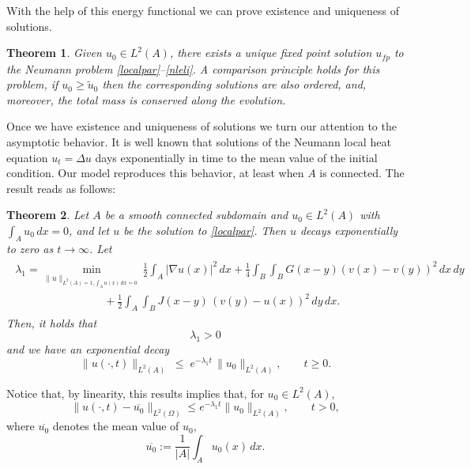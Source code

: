 \documentclass[reqno]{amsart}
\numberwithin{equation}{section}
\newtheorem{theorem}{Theorem}[section]
\begin{document}
With the help of this energy functional we can prove existence and uniqueness of solutions. 

\begin{theorem} \label{teo.existencia.uni.intro}
Given $u_0\in L^2(A)$, there exists a unique fixed point solution $u_{fp}$ to the Neumann problem \eqref{localpar}--\eqref{nleli}. A comparison principle holds for this problem, if $u_0\ge \widetilde{u}_0$ then the corresponding solutions are also ordered,
and, moreover, the total mass is conserved along the evolution.
\end{theorem}

Once we have existence and uniqueness of solutions we turn our attention to 
the asymptotic behavior. 
It is well known that solutions of the Neumann local heat equation 
$u_t = \Delta u $
days exponentially in time to the mean value of the initial condition. 
Our model reproduces this behavior, at least when $A$ is connected. 
The result reads as follows:

\begin{theorem}\label{thm:expdecay.intro} Let $A$ be a smooth connected subdomain and
 $u_0\in L^2(A)$ with $\int_A u_0\,dx = 0$, and let $u$ be the 
solution to \eqref{localpar}.  
Then $u$ decays exponentially to zero as $t\to\infty$.  
Let
\begin{align}\label{introeigenvalue}
\begin{array}{l}
\displaystyle
\lambda_1  = 
\min_{\| u \|_{L^2 (A)=1,\int_A u (x) \, dx =0}} 
 \frac12\int_A |\nabla u(x)|^2\,dx
  + \frac14 \int_B\!\int_B G(x-y)(v(x)-v(y))^2\,dx\,dy 
  \\[10pt]
  \qquad \qquad \qquad \qquad \displaystyle + \frac12\int_A\int_B J(x-y)\,(v(y)-u(x))^2\,dy\,dx.
  \end{array}
\end{align}
Then, it holds that
$$\lambda_1  >0$$
and we have an exponential decay
\begin{equation}\label{abneumann.intro}
\|u(\cdot,t)\|_{L^2(A)}
\;\le\;
e^{- \lambda_1 t}\,\|u_0\|_{L^2(A)},
\qquad t\ge 0.
\end{equation}
\end{theorem}

Notice that, by linearity, this results implies that, for $u_0 \in L^2 (A)$, 
\[
\| u(\cdot,t) - \overline{u_0} \|_{L^2(\Omega)}
\le
 e^{-\lambda_1 t}\|u_0\|_{L^2(A)},
\qquad t > 0,
\]
where $\overline{u_0}$ denotes the mean value of $u_0$,
\[
\overline{u_0} := \frac{1}{|A|} \int_A u_0(x)\,dx.
\]
\end{document}
